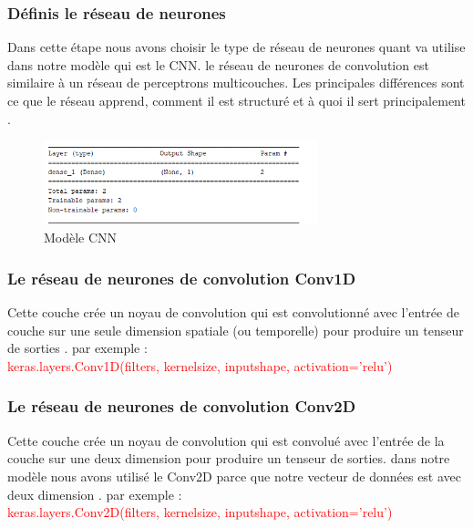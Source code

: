 \documentclass[12pt]{report}
\begin{document}
\subsubsection{Définis le réseau de neurones}
Dans cette étape nous avons choisir le type de réseau de neurones quant va utilise dans notre modèle qui est 
le CNN. le réseau de neurones de convolution est similaire à un réseau de perceptrons multicouches. Les principales différences sont ce que le réseau apprend, comment il est structuré et à quoi il sert principalement \cite{ref30} .\\
\begin{figure}[h]
\begin{center}
\includegraphics[width=300]{Capture.png}
\caption{Modèle CNN}
\end{center}
\end{figure}
\subsubsection{Le réseau de neurones de convolution Conv1D}
Cette couche crée un noyau de convolution qui est convolutionné avec l'entrée de couche sur une seule dimension spatiale (ou temporelle) pour produire un tenseur de sorties \cite{ref31} . par exemple :\\
\textcolor{red}{ keras.layers.Conv1D(filters, kernelsize, inputshape, activation='relu')} \cite{ref31}

\subsubsection{Le réseau de neurones de convolution Conv2D}
Cette couche crée un noyau de convolution qui est convolué avec l'entrée de la couche  sur une deux dimension pour produire un tenseur de sorties. dans notre modèle nous avons utilisé le Conv2D parce que notre vecteur de données est avec deux dimension \cite{ref31} . par exemple :  \\
\textcolor{red}{keras.layers.Conv2D(filters, kernelsize, inputshape, activation='relu')} \cite{ref31}
\newpage
\end{document}
